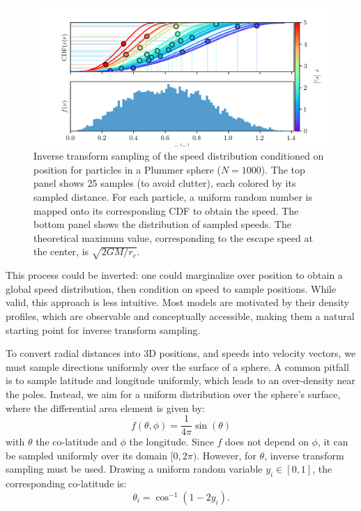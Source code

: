             \begin{figure}
                \includegraphics[width=\linewidth]{images/inverse_transform_sampling_velocities.png}
                \caption{Inverse transform sampling of the speed distribution conditioned on position for particles in a Plummer sphere ($N = 1000$). The top panel shows 25 samples (to avoid clutter), each colored by its sampled distance. For each particle, a uniform random number is mapped onto its corresponding CDF to obtain the speed. The bottom panel shows the distribution of sampled speeds. The theoretical maximum value, corresponding to the escape speed at the center, is $\sqrt{2GM/r_c}$.}
                \label{fig:inverse_transform_sampling_velocities}
            \end{figure}

            This process could be inverted: one could marginalize over position to obtain a global speed distribution, then condition on speed to sample positions. While valid, this approach is less intuitive. Most models are motivated by their density profiles, which are observable and conceptually accessible, making them a natural starting point for inverse transform sampling.
            
            To convert radial distances into 3D positions, and speeds into velocity vectors, we must sample directions uniformly over the surface of a sphere. A common pitfall is to sample latitude and longitude uniformly, which leads to an over-density near the poles. Instead, we aim for a uniform distribution over the sphere's surface, where the differential area element is given by:
            \begin{equation}
                f(\theta,\phi)=\frac{1}{4\pi}\sin(\theta)
            \end{equation} 
            with $\theta$ the co-latitude and $\phi$ the longitude. Since $f$ does not depend on $\phi$, it can be sampled uniformly over its domain $[0, 2\pi)$. However, for $\theta$, inverse transform sampling must be used. Drawing a uniform random variable $y_i \in [0,1]$, the corresponding co-latitude is:
            \begin{equation}
                \theta_i = \cos^{-1}\left(1-2y_i\right).
            \end{equation}

